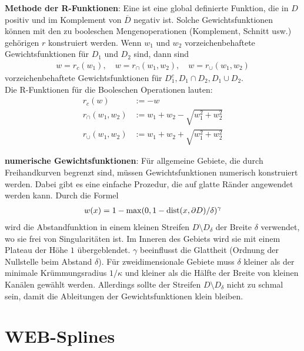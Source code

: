 \linie

\textbf{Methode der R-Funktionen}:
Eine  ist eine global definierte Funktion,
die in $D$ positiv und im Komplement von $\overline{D}$ negativ ist.
Solche Gewichtsfunktionen können mit den zu booleschen Mengenoperationen (Komplement, Schnitt usw.)
gehörigen  $r$ konstruiert werden.
Wenn $w_1$ und $w_2$ vorzeichenbehaftete Gewichtsfunktionen für $D_1$ und $D_2$ sind, dann sind
\begin{align*}
    w = r_c(w_1),\quad
    w = r_\cap(w_1, w_2),\quad
    w = r_\cup(w_1, w_2)
\end{align*}
vorzeichenbehaftete Gewichtsfunktionen für $D_1^c, D_1 \cap D_2, D_1 \cup D_2$.\\
Die R-Funktionen für die Booleschen Operationen lauten:
\begin{align*}
    r_c(w) &:= -w\\
    r_\cap(w_1, w_2) &:= w_1 + w_2 - \sqrt{w_1^2 + w_2^2}\\
    r_\cup(w_1, w_2) &:= w_1 + w_2 + \sqrt{w_1^2 + w_2^2}
\end{align*}

\linie

\textbf{numerische Gewichtsfunktionen}:
Für allgemeine Gebiete, die durch Freihandkurven begrenzt sind,
müssen Gewichtsfunktionen numerisch konstruiert werden.
Dabei gibt es eine einfache Prozedur, die auf glatte Ränder angewendet werden kann.
Durch die Formel
\begin{align*}
    w(x) = 1 - \max(0, 1 - \operatorname{dist}(x, \partial D)/\delta)^\gamma
\end{align*}
wird die Abstandfunktion in einem kleinen Streifen $D \setminus D_\delta$ der Breite $\delta$
verwendet, wo sie frei von Singularitäten ist.
Im Inneren des Gebiets wird sie mit einem Plateau der Höhe $1$ übergeblendet.
$\gamma$ beeinflusst die Glattheit (Ordnung der Nullstelle beim Abstand $\delta$).
Für zweidimensionale Gebiete muss $\delta$ kleiner als der minimale Krümmungsradius $1/\kappa$
und kleiner als die Hälfte der Breite von kleinen Kanälen gewählt werden.
Allerdings sollte der Streifen $D \setminus D_\delta$ nicht zu schmal sein,
damit die Ableitungen der Gewichtsfunktionen klein bleiben.

\pagebreak

\section{%
    WEB-Splines%
}


